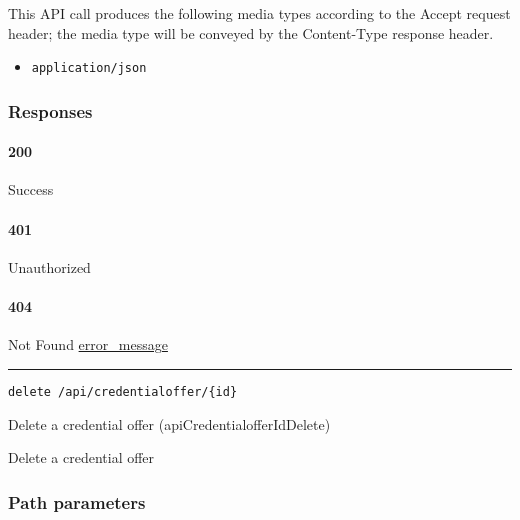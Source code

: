 This API call produces the following media types according to the
{Accept} request header; the media type will be conveyed by the
{Content-Type} response header.

\begin{itemize}
\tightlist
\item
  \texttt{application/json}
\end{itemize}

\hypertarget{responses-35}{%
\subsubsection{Responses}\label{responses-35}}

\hypertarget{section-118}{%
\paragraph{200}\label{section-118}}

Success

\hypertarget{section-119}{%
\paragraph{401}\label{section-119}}

Unauthorized \protect\hyperlink{}{}

\hypertarget{section-120}{%
\paragraph{404}\label{section-120}}

Not Found \protect\hyperlink{error_message}{error\_message}

\begin{center}\rule{0.5\linewidth}{\linethickness}\end{center}

\protect\hypertarget{apiCredentialofferIdDelete}{}{}

\begin{verbatim}
delete /api/credentialoffer/{id}
\end{verbatim}

Delete a credential offer ({apiCredentialofferIdDelete})

Delete a credential offer

\hypertarget{path-parameters-19}{%
\subsubsection{Path parameters}\label{path-parameters-19}}

